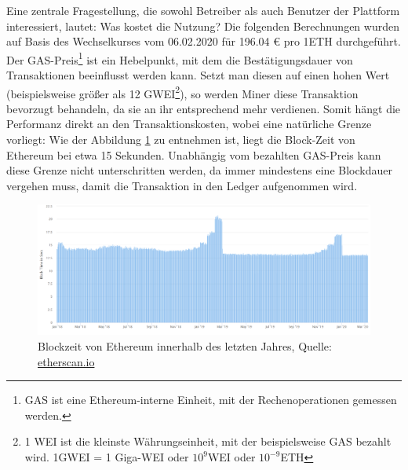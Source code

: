 Eine zentrale Fragestellung, die sowohl Betreiber als auch Benutzer der Plattform interessiert, lautet: Was kostet die Nutzung? Die folgenden Berechnungen wurden auf Basis des Wechselkurses vom 06.02.2020 für 196.04 € pro 1ETH durchgeführt.\\
Der GAS-Preis\footnote{GAS ist eine Ethereum-interne Einheit, mit der Rechenoperationen gemessen werden.} ist ein Hebelpunkt, mit dem die Bestätigungsdauer von Transaktionen beeinflusst werden kann. Setzt man diesen auf einen hohen Wert (beispielsweise größer als 12 GWEI\footnote{1 WEI ist die kleinste Währungseinheit, mit der beispielsweise GAS bezahlt wird. 1GWEI = 1 Giga-WEI oder $ 10^{9} $WEI oder $ 10^{-9} $ETH}), so werden Miner diese Transaktion bevorzugt behandeln, da sie an ihr entsprechend mehr verdienen. Somit hängt die Performanz direkt an den Transaktionskosten, wobei eine natürliche Grenze vorliegt: Wie der Abbildung \ref{fig:chapter07:blocktime} zu entnehmen ist, liegt die Block-Zeit von Ethereum bei etwa 15 Sekunden. Unabhängig vom bezahlten GAS-Preis kann diese Grenze nicht unterschritten werden, da immer mindestens eine Blockdauer vergehen muss, damit die Transaktion in den Ledger aufgenommen wird.

\begin{figure}[h]
 \centering
 \includegraphics[width=1.0\textwidth]{gfx/screenshots/blocktime_ETH.PNG}
 \caption[Blockzeit von Ethereum innerhalb des letzten Jahres]{Blockzeit von Ethereum innerhalb des letzten Jahres, Quelle: \url{etherscan.io}}
 \label{fig:chapter07:blocktime}
\end{figure}

